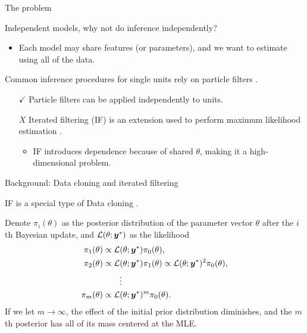 \documentclass[aspectratio=169]{beamer}\usepackage[]{graphicx}\usepackage[]{xcolor}
\begin{document}
\begin{frame}{The problem}

  Independent models, why not do inference independently? 

  \begin{itemize}
    \item Each model may share features (or parameters), and we want to estimate using all of the data. 
  \end{itemize}
  Common inference procedures for single units rely on particle filters \citep{arulampalam02}.
  \begin{itemize}
    \item[{\color{green} $\checkmark$}] Particle filters can be applied independently to units.
    \item[{\color{red} $X$}] Iterated filtering (IF) is an extension used to perform maximum likelihood estimation \citep{ionides15}.
    \begin{itemize}
      \item IF introduces dependence because of shared $\theta$, making it a high-dimensional problem.
    \end{itemize}
  \end{itemize}

\end{frame}

\begin{frame}{Background: Data cloning and iterated filtering}
  
  IF is a special type of Data cloning \citep{lele07}. 
  
  Denote $\pi_i(\theta)$ as the posterior distribution of the parameter vector $\theta$ after the $i$th Bayesian update, and $\mathcal{L}(\theta; \bm{y}^*)$ as the likelihood
\begin{align*}
\pi_1(\theta) &\propto \mathcal{L}(\theta; \bm{y}^*)\pi_0(\theta), \\
\pi_2(\theta) &\propto \mathcal{L}(\theta; \bm{y}^*)\pi_1(\theta) \propto \mathcal{L}(\theta; \bm{y}^*)^2\pi_0(\theta),\\
&\quad\quad\vdots\\
\pi_m(\theta) &\propto \mathcal{L}(\theta; \bm{y}^*)^m\pi_0(\theta).
\end{align*}
If we let $m\rightarrow \infty$, the effect of the initial prior distribution diminishes, and the $m$th posterior has all of its mass centered at the MLE.

\end{frame}
\end{document}
